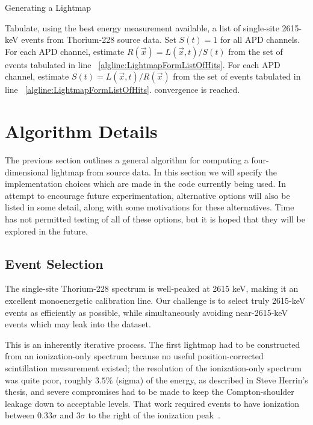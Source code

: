 \begin{algorithm}
\caption{Generating a Lightmap}
\label{alg:LightmapScheme}
\begin{algorithmic}[1]
\STATE Tabulate, using the best energy measurement available, a list of single-site 2615-keV events from Thorium-228 source data. \label{algline:LightmapFormListOfHits}
\STATE Set $S(t) = 1$ for all APD channels.
\REPEAT
  \STATE For each APD channel, estimate $R(\vec{x}) = L(\vec{x},t)/S(t)$ from the set of events tabulated in line ~\ref{algline:LightmapFormListOfHits}.
  \STATE For each APD channel, estimate $S(t) = L(\vec{x},t)/R(\vec{x})$ from the set of events tabulated in line ~\ref{algline:LightmapFormListOfHits}.
\UNTIL convergence is reached.
\end{algorithmic}
\end{algorithm}


\section{Algorithm Details}

The previous section outlines a general algorithm for computing a four-dimensional lightmap from source data.  In this section we will specify the implementation choices which are made in the code currently being used.  In attempt to encourage future experimentation, alternative options will also be listed in some detail, along with some motivations for these alternatives.  Time has not permitted testing of all of these options, but it is hoped that they will be explored in the future.

\subsection{Event Selection}\label{sec:LightmapEventSelection}

The single-site Thorium-228 spectrum is well-peaked at 2615 keV, making it an excellent monoenergetic calibration line.  Our challenge is to select truly 2615-keV events as efficiently as possible, while simultaneously avoiding near-2615-keV events which may leak into the dataset.

This is an inherently iterative process.  The first lightmap had to be constructed from an ionization-only spectrum because no useful position-corrected scintillation measurement existed; the resolution of the ionization-only spectrum was quite poor, roughly $3.5\%$ (sigma) of the energy, as described in Steve Herrin's thesis, and severe compromises had to be made to keep the Compton-shoulder leakage down to acceptable levels.  That work required events to have ionization between $0.33\sigma$ and $3\sigma$ to the right of the ionization peak~\cite{ThesisSteve}.

